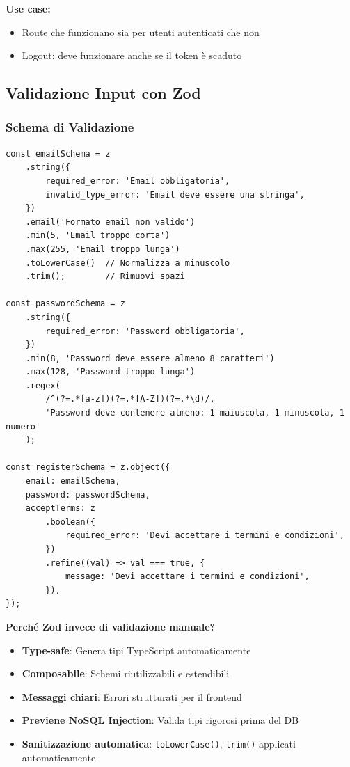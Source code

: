 \documentclass[11pt,a4paper]{article}
\newcommand{\code}[1]{\texttt{#1}}
\begin{document}
\textbf{Use case:}
\begin{itemize}
    \item Route che funzionano sia per utenti autenticati che non
    \item Logout: deve funzionare anche se il token è scaduto
\end{itemize}

\subsection{Validazione Input con Zod}

\subsubsection{Schema di Validazione}

\begin{lstlisting}[caption=Schema Zod per Registrazione]
const emailSchema = z
    .string({
        required_error: 'Email obbligatoria',
        invalid_type_error: 'Email deve essere una stringa',
    })
    .email('Formato email non valido')
    .min(5, 'Email troppo corta')
    .max(255, 'Email troppo lunga')
    .toLowerCase()  // Normalizza a minuscolo
    .trim();        // Rimuovi spazi

const passwordSchema = z
    .string({
        required_error: 'Password obbligatoria',
    })
    .min(8, 'Password deve essere almeno 8 caratteri')
    .max(128, 'Password troppo lunga')
    .regex(
        /^(?=.*[a-z])(?=.*[A-Z])(?=.*\d)/,
        'Password deve contenere almeno: 1 maiuscola, 1 minuscola, 1 numero'
    );

const registerSchema = z.object({
    email: emailSchema,
    password: passwordSchema,
    acceptTerms: z
        .boolean({
            required_error: 'Devi accettare i termini e condizioni',
        })
        .refine((val) => val === true, {
            message: 'Devi accettare i termini e condizioni',
        }),
});
\end{lstlisting}

\textbf{Perché Zod invece di validazione manuale?}
\begin{itemize}
    \item \textbf{Type-safe}: Genera tipi TypeScript automaticamente
    \item \textbf{Composabile}: Schemi riutilizzabili e estendibili
    \item \textbf{Messaggi chiari}: Errori strutturati per il frontend
    \item \textbf{Previene NoSQL Injection}: Valida tipi rigorosi prima del DB
    \item \textbf{Sanitizzazione automatica}: \code{toLowerCase()}, \code{trim()} applicati automaticamente
\end{itemize}
\end{document}
